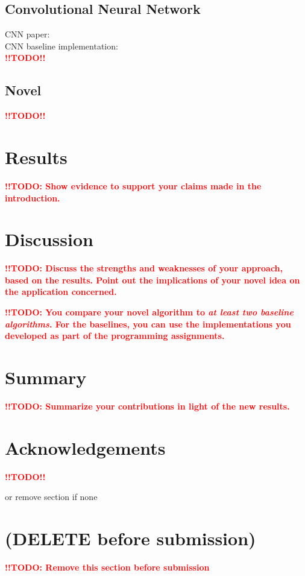 \documentclass[10pt,conference,compsocconf]{IEEEtran}
\newcommand{\todo}{\textcolor{red}{\textbf{!!TODO!!}}}
\newcommand{\todoThis}[1]{\textcolor{red}{\textbf{!!TODO: #1}}}
\begin{document}
\subsection{Convolutional Neural Network}\label{sub:cnn}
CNN paper: \cite{cnn_paper}\\
CNN baseline implementation: \cite{cnn_base}\\
\todo

\subsection{Novel}\label{sub:novel}
\todo

\section{Results}\label{sec:results}
\todoThis{Show evidence to support your claims made in the
  introduction.}
  
\section{Discussion}\label{sec:discussion}
\todoThis{Discuss the strengths and weaknesses of your
  approach, based on the results. Point out the implications of your
  novel idea on the application concerned.}
  
\todoThis{You compare your novel algorithm to \emph{at least two baseline
  algorithms}. For the baselines, you can use the implementations you
developed as part of the programming assignments.\\}
  
\section{Summary}\label{sec:summary}
\todoThis{Summarize your contributions in light of the new
  results.}

\section*{Acknowledgements}
\todo

or remove section if none



\section{(DELETE before submission)}
\todoThis{Remove this section before submission}\\
\end{document}
